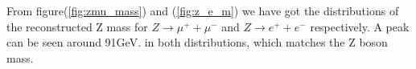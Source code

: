 From figure(\ref{fig:zmu_mass}) and (\ref{fig:z_e_m}) we have got the distributions of the reconstructed Z  mass for $Z\longrightarrow \mu^{+} + \mu^{-}$ and $Z\longrightarrow e^{+} + e^{-}$ respectively.  A peak can be seen around 91GeV. in both distributions, which matches the Z boson mass.


